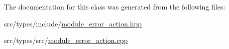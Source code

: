 The documentation for this class was generated from the following files\+:\begin{DoxyCompactItemize}
\item 
src/types/include/\hyperlink{module__error__action_8hpp}{module\+\_\+error\+\_\+action.\+hpp}\item 
src/types/src/\hyperlink{module__error__action_8cpp}{module\+\_\+error\+\_\+action.\+cpp}\end{DoxyCompactItemize}

